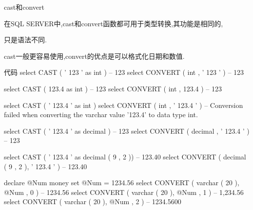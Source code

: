 cast和convert

在SQL SERVER中,cast和convert函数都可用于类型转换,其功能是相同的,

只是语法不同.

cast一般更容易使用,convert的优点是可以格式化日期和数值.

代码
select   CAST ( ' 123 '   as   int )    --  123
select   CONVERT ( int ,  ' 123 ' )   --  123

select   CAST ( 123.4   as   int )    --  123
select   CONVERT ( int ,  123.4 )   --  123 

select   CAST ( ' 123.4 '   as   int )
select   CONVERT ( int ,  ' 123.4 ' )
--  Conversion failed when converting the varchar value '123.4' to data type int.

select   CAST ( ' 123.4 '   as   decimal )   --  123
select   CONVERT ( decimal ,  ' 123.4 ' )  --  123 


select   CAST ( ' 123.4 '   as   decimal ( 9 , 2 ))   --  123.40
select   CONVERT ( decimal ( 9 , 2 ),  ' 123.4 ' )  --  123.40


declare   @Num   money
set   @Num   =   1234.56
select   CONVERT ( varchar ( 20 ),  @Num ,  0 )   --  1234.56
select   CONVERT ( varchar ( 20 ),  @Num ,  1 )   --  1,234.56
select   CONVERT ( varchar ( 20 ),  @Num ,  2 )   --  1234.5600






















